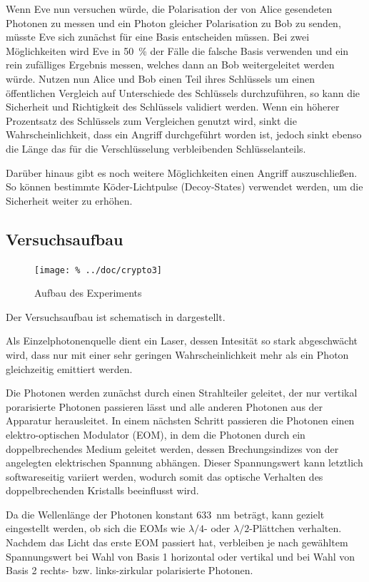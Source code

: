 Wenn Eve nun versuchen würde, die Polarisation der von Alice gesendeten Photonen
zu messen und ein Photon gleicher Polarisation zu Bob zu senden, müsste Eve
sich zunächst für eine Basis entscheiden müssen. Bei zwei Möglichkeiten wird
Eve in \SI{50}{\percent} der Fälle die falsche Basis verwenden und ein rein
zufälliges Ergebnis messen, welches dann an Bob weitergeleitet werden würde.
Nutzen nun Alice und Bob einen Teil ihres Schlüssels um einen öffentlichen
Vergleich auf Unterschiede des Schlüssels durchzuführen, so kann die Sicherheit
und Richtigkeit des Schlüssels validiert werden. Wenn ein höherer Prozentsatz
des Schlüssels zum Vergleichen genutzt wird, sinkt die Wahrscheinlichkeit, dass
ein Angriff durchgeführt worden ist, jedoch sinkt ebenso die Länge das für die
Verschlüsselung verbleibenden Schlüsselanteils.

Darüber hinaus gibt es noch weitere Möglichkeiten einen Angriff auszuschließen.
So können bestimmte Köder-Lichtpulse (Decoy-States) verwendet werden, um die
Sicherheit weiter zu erhöhen.

\subsection{Versuchsaufbau}

\begin{figure}[htb]
 \centering
 \texttt{[image: \%
  ../doc/crypto3]}
 \caption{Aufbau des Experiments}
 \label{fig:aufbau}
\end{figure}

Der Versuchsaufbau ist schematisch in  dargestellt.

Als Einzelphotonenquelle dient ein Laser, dessen Intesität so stark abgeschwächt
wird, dass nur mit einer sehr geringen Wahrscheinlichkeit mehr als ein Photon
gleichzeitig emittiert werden.

Die Photonen werden zunächst durch einen Strahlteiler geleitet, der nur vertikal
porarisierte Photonen passieren lässt und alle anderen Photonen aus der Apparatur
herausleitet. In einem nächsten Schritt passieren die Photonen einen 
elektro-optischen Modulator (EOM), in dem die Photonen durch ein
doppelbrechendes Medium geleitet werden, dessen Brechungsindizes von der
angelegten elektrischen Spannung abhängen. Dieser Spannungswert kann letztlich
softwareseitig variiert werden, wodurch somit das optische Verhalten des
doppelbrechenden Kristalls beeinflusst wird.

Da die Wellenlänge der Photonen konstant \SI{633}{nm} beträgt, kann gezielt
eingestellt werden, ob sich die EOMs wie $λ/4$- oder $λ/2$-Plättchen verhalten.
Nachdem das Licht das erste EOM passiert hat, verbleiben je nach gewähltem
Spannungswert bei Wahl von Basis 1 horizontal oder vertikal und bei Wahl von
Basis 2 rechts- bzw. links-zirkular polarisierte Photonen.

